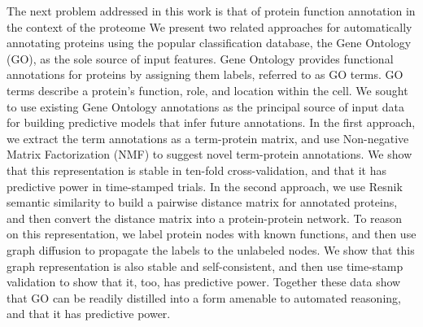 \documentclass[12pt,a4paper]{report}
\begin{document}
The next problem addressed in this work is that of protein function annotation in the context of the proteome  We present two related approaches for automatically annotating proteins using the popular classification database, the Gene Ontology (GO), as the sole source of input features. Gene Ontology provides functional annotations for proteins by assigning them labels, referred to as GO terms. GO terms describe a protein’s function, role, and location within the cell. We sought to use existing Gene Ontology annotations as the principal source of input data for building predictive models that infer future annotations. In the first approach, we extract the term annotations as a term-protein matrix, and use Non-negative Matrix Factorization (NMF) to suggest novel term-protein annotations. We show that this representation is stable in ten-fold cross-validation, and that it has predictive power in time-stamped trials. In the second approach, we use Resnik semantic similarity to build a pairwise distance matrix for annotated proteins, and then convert the distance matrix into a protein-protein network. To reason on this representation, we label protein nodes with known functions, and then use graph diffusion to propagate the labels to the unlabeled nodes. We show that this graph representation is also stable and self-consistent, and then use time-stamp validation to show that it, too, has predictive power. Together these data show that GO can be readily distilled into a form amenable to automated reasoning, and that it has predictive power.


\tableofcontents

{%
\let\oldnumberline\numberline%
\renewcommand{\numberline}{\figurename~\oldnumberline}%
\listoffigures%
}
\end{document}
